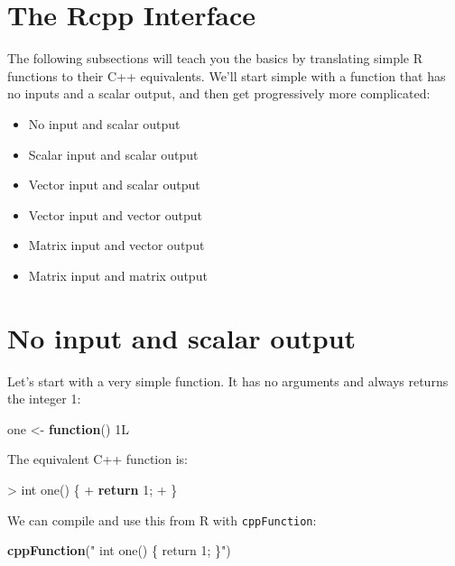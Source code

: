\documentclass[]{krantz}
\makeatletter
\newenvironment{Shaded}{\begin{snugshade}}{\end{snugshade}}
\newcommand{\ControlFlowTok}[1]{\textcolor[rgb]{0.27,0.27,0.27}{\textbf{#1}}}
\newcommand{\DataTypeTok}[1]{\textcolor[rgb]{0.27,0.27,0.27}{#1}}
\newcommand{\DecValTok}[1]{\textcolor[rgb]{0.06,0.06,0.06}{#1}}
\newcommand{\KeywordTok}[1]{\textcolor[rgb]{0.27,0.27,0.27}{\textbf{#1}}}
\newcommand{\NormalTok}[1]{#1}
\newcommand{\StringTok}[1]{\textcolor[rgb]{0.5,0.5,0.5}{#1}}
\providecommand{\tightlist}{%
  \setlength{\itemsep}{0pt}\setlength{\parskip}{0pt}}
\newenvironment{kframe}{%
\medskip{}
\setlength{\fboxsep}{.8em}
 \def\at@end@of@kframe{}%
 \ifinner\ifhmode%
  \def\at@end@of@kframe{\end{minipage}}%
  \begin{minipage}{\columnwidth}%
 \fi\fi%
 \def\FrameCommand##1{\hskip\@totalleftmargin \hskip-\fboxsep
 \colorbox{shadecolor}{##1}\hskip-\fboxsep
     \hskip-\linewidth \hskip-\@totalleftmargin \hskip\columnwidth}%
 \MakeFramed {\advance\hsize-\width
   \@totalleftmargin\z@ \linewidth\hsize
   \@setminipage}}%
 {\par\unskip\endMakeFramed%
 \at@end@of@kframe}
\renewenvironment{Shaded}{\begin{kframe}}{\end{kframe}}
\makeatother
\begin{document}
\hypertarget{the-rcpp-interface}{%
\section{The Rcpp Interface}\label{the-rcpp-interface}}

The following subsections will teach you the basics by translating simple R functions to their C++ equivalents. We'll start simple with a function that has no inputs and a scalar output, and then get progressively more complicated:

\begin{itemize}
\tightlist
\item
  No input and scalar output
\item
  Scalar input and scalar output
\item
  Vector input and scalar output
\item
  Vector input and vector output
\item
  Matrix input and vector output
\item
  Matrix input and matrix output
\end{itemize}

\hypertarget{no-input-and-scalar-output}{%
\section{No input and scalar output}\label{no-input-and-scalar-output}}

Let's start with a very simple function. It has no arguments and always returns the integer 1:

\begin{Shaded}
\begin{Highlighting}[]
\NormalTok{one <-}\StringTok{ }\ControlFlowTok{function}\NormalTok{() 1L}
\end{Highlighting}
\end{Shaded}

The equivalent C++ function is:

\begin{Shaded}
\begin{Highlighting}[]
\NormalTok{> }\DataTypeTok{int}\NormalTok{ one() \{}
\NormalTok{+   }\ControlFlowTok{return} \DecValTok{1}\NormalTok{;}
\NormalTok{+ \}}
\end{Highlighting}
\end{Shaded}

We can compile and use this from R with \texttt{cppFunction}:

\begin{Shaded}
\begin{Highlighting}[]
\KeywordTok{cppFunction}\NormalTok{(}\StringTok{"}
\StringTok{  int one() \{}
\StringTok{  return 1;}
\StringTok{  \}"}\NormalTok{)}
\end{Highlighting}
\end{Shaded}
\end{document}
